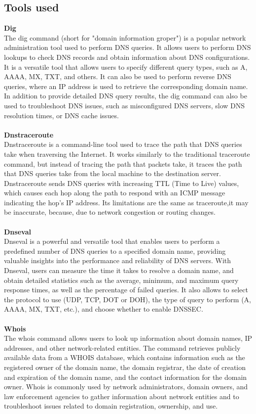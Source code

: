\documentclass[eng]{class}
\begin{document}
\subsection{Tools used}
\textbf{Dig} \\
The dig command (short for "domain information groper") is a popular network administration tool used to perform DNS queries.
It allows users to perform DNS lookups to check DNS records and obtain information about DNS configurations.
It is a versatile tool that allows users to specify different query types, such as A, AAAA, MX, TXT, and others.
It can also be used to perform reverse DNS queries, where an IP address is used to retrieve the corresponding domain name.
In addition to provide detailed DNS query results, the dig command can also be used to troubleshoot DNS issues, such as misconfigured DNS servers,
slow DNS resolution times, or DNS cache issues.\\
\\
\textbf{Dnstraceroute} \\
Dnstraceroute is a command-line tool used to trace the path that DNS queries take when traversing the Internet.
It works similarly to the traditional traceroute command, but instead of tracing the path that packets take,
it traces the path that DNS queries take from the local machine to the destination server.
Dnstraceroute sends DNS queries with increasing TTL (Time to Live) values,
which causes each hop along the path to respond with an ICMP message indicating the hop's IP address.
Its limitations are the same as traceroute,it may be inaccurate, because, due to network congestion or routing changes.\\
\\
\textbf{Dnseval} \\
Dnseval is a powerful and versatile tool that enables users to perform a predefined number of DNS queries to a specified domain name,
providing valuable insights into the performance and reliability of DNS servers.
With Dnseval, users can measure the time it takes to resolve a domain name, and obtain detailed statistics such as the average, minimum,
and maximum query response times, as well as the percentage of failed queries.
It also allows  to select the protocol to use (UDP, TCP, DOT or DOH), the type of query to perform (A, AAAA, MX, TXT, etc.),
and choose whether to enable DNSSEC.\\
\\
\textbf{Whois} \\
The whois command allows users to look up information about domain names, IP addresses, and other network-related entities.
The command retrieves publicly available data from a WHOIS database, which contains information such as the registered owner of the domain name,
the domain registrar, the date of creation and expiration of the domain name, and the contact information for the domain owner.
Whois is commonly used by network administrators, domain owners, and law enforcement agencies to gather information
about network entities and to troubleshoot issues related to domain registration, ownership, and use.\\
\end{document}
